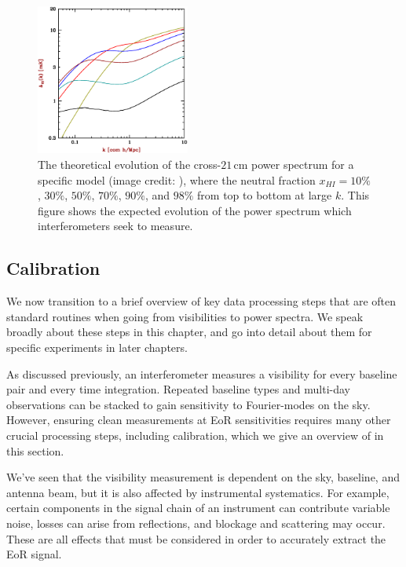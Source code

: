 \begin{figure}
    \centering
    \includegraphics[width=0.45\textwidth]{plots/PS_evolution.eps}
    \caption{The theoretical evolution of the cross-$21$\,cm power spectrum for a specific model (image credit: \citet{barkana2009}), where the neutral fraction $x_{HI} = 10\%$, $30\%$, $50\%$, $70\%$, $90\%$, and $98\%$ from top to bottom at large $k$. This figure shows the expected evolution of the power spectrum which interferometers seek to measure.}
    \label{fig:PS_evolution}
\end{figure}

\subsection{Calibration}
\label{sec:calibration_intro}

We now transition to a brief overview of key data processing steps that are often standard routines when going from visibilities to power spectra. We speak broadly about these steps in this chapter, and go into detail about them for specific experiments in later chapters.

As discussed previously, an interferometer measures a visibility for every baseline pair and every time integration. Repeated baseline types and multi-day observations can be stacked to gain sensitivity to Fourier-modes on the sky. However, ensuring clean measurements at EoR sensitivities requires many other crucial processing steps, including calibration, which we give an overview of in this section.

We've seen that the visibility measurement is dependent on the sky, baseline, and antenna beam, but it is also affected by instrumental systematics. For example, certain components in the signal chain of an instrument can contribute variable noise, losses can arise from reflections, and blockage and scattering may occur. These are all effects that must be considered in order to accurately extract the EoR signal. 

